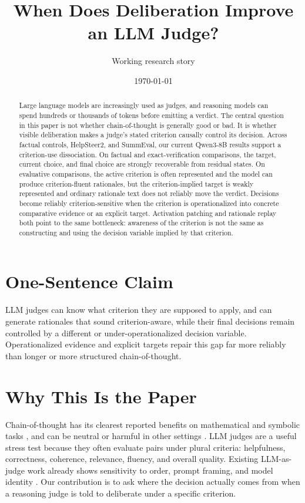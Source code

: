 \documentclass[11pt]{article}
\title{When Does Deliberation Improve an LLM Judge?}
\author{Working research story}
\date{\today}
\begin{document}
\maketitle

\begin{abstract}
Large language models are increasingly used as judges, and reasoning models
can spend hundreds or thousands of tokens before emitting a verdict. The
central question in this paper is not whether chain-of-thought is generally
good or bad. It is whether visible deliberation makes a judge's stated
criterion causally control its decision. Across factual controls, HelpSteer2,
and SummEval, our current Qwen3-8B results support a criterion-use
dissociation. On factual and exact-verification comparisons, the target,
current choice, and final choice are strongly recoverable from residual
states. On evaluative comparisons, the active criterion is often represented
and the model can produce criterion-fluent rationales, but the
criterion-implied target is weakly represented and ordinary rationale text
does not reliably move the verdict. Decisions become reliably
criterion-sensitive when the criterion is operationalized into concrete
comparative evidence or an explicit target. Activation patching and rationale
replay both point to the same bottleneck: awareness of the criterion is not
the same as constructing and using the decision variable implied by that
criterion.
\end{abstract}

\section{One-Sentence Claim}

LLM judges can know what criterion they are supposed to apply, and can
generate rationales that sound criterion-aware, while their final decisions
remain controlled by a different or under-operationalized decision variable.
Operationalized evidence and explicit targets repair this gap far more
reliably than longer or more structured chain-of-thought.

\section{Why This Is the Paper}

Chain-of-thought has its clearest reported benefits on mathematical and
symbolic tasks \citep{sprague2024tocot}, and can be neutral or harmful in
other settings \citep{liu2024mindstep}. LLM judges are a useful stress test
because they often evaluate pairs under plural criteria: helpfulness,
correctness, coherence, relevance, fluency, and overall quality. Existing
LLM-as-judge work already shows sensitivity to order, prompt framing, and
model identity \citep{zheng2023judging,wang2023position,
panickssery2024selfrecognition}. Our contribution is to ask where the
decision actually comes from when a reasoning judge is told to deliberate
under a specific criterion.
\end{document}
